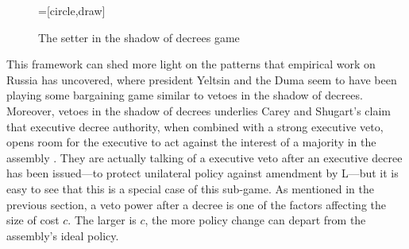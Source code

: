\begin{figure}
  \begin{center}
    =[circle,draw]
    \caption{The setter in the shadow of decrees game}\label{f:setterShadowDecreeGame}
  \end{center}
\end{figure}

This framework can shed more light on the patterns that \citet{remington.etal.1998} empirical work on Russia has uncovered, where president Yeltsin and the Duma seem to have been playing some bargaining game similar to vetoes in the shadow of decrees.  Moreover, vetoes in the shadow of decrees underlies Carey and Shugart's claim that executive decree authority, when combined with a strong executive veto, opens room for the executive to act against the interest of a majority in the assembly \citeyearpar[][18]{carey.shugart.1998a}.  They are actually talking of a executive veto after an executive decree has been issued---to protect unilateral policy against amendment by L---but it is easy to see that this is a special case of this sub-game.  As mentioned in the previous section, a veto power after a decree is one of the factors affecting the size of cost $c$.  The larger is $c$, the more policy change can depart from the assembly's ideal policy.  

